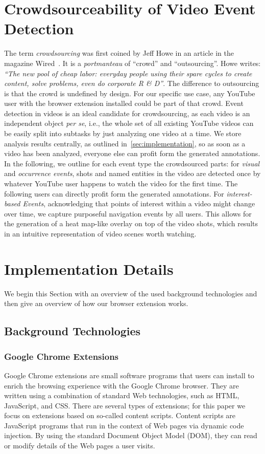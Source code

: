 \documentclass[runningheads,a4paper]{llncs}
\begin{document}
\section{Crowdsourceability of Video Event Detection} \label{sec:crowdsourcing}
The term \emph{crowdsourcing} was first coined by Jeff Howe in an article in the magazine Wired~\cite{crowdsourcing}. It is a \textit{portmanteau} of ``crowd'' and ``outsourcing''. Howe writes: \textit{``The new pool of cheap labor: everyday people using their spare cycles to create content, solve problems, even do corporate R \& D''}. The difference to outsourcing is that the crowd is undefined by design. For our specific use case, any YouTube user with the browser extension installed could be part of that crowd. Event detection in videos is an ideal candidate for crowdsourcing, as each video is an independent object \textit{per se}, i.e., the whole set of all existing YouTube videos can be easily split into subtasks by just analyzing one video at a time. We store analysis results centrally, as outlined in~\autoref{sec:implementation}, so as soon as a video has been analyzed, everyone else can profit form the generated annotations. In the following, we outline for each event type the crowdsourced parts: for \emph{visual} and \emph{occurrence events}, shots and named entities in the video are detected once by whatever YouTube user happens to watch the video for the first time. The following users can directly profit form the generated annotations. For \emph{interest-based Events}, acknowledging that points of interest within a video might change over time, we capture purposeful navigation events by all users. This allows for the generation of a heat map-like overlay on top of the video shots, which results in an intuitive representation of video scenes worth watching.

\section{Implementation Details} \label{sec:implementation}
We begin this Section with an overview of the used background technologies and then give an overview of how our browser extension works.

\subsection{Background Technologies}

\subsubsection{Google Chrome Extensions}
Google Chrome extensions are small software programs that users can install to enrich the browsing experience with the Google Chrome browser. They are written using a combination of standard Web technologies, such as HTML, JavaScript, and CSS. There are several types of extensions; for this paper we focus on extensions based on so-called content scripts. Content scripts are JavaScript programs that run in the context of Web pages via dynamic code injection. By using the standard Document Object Model (DOM), they can read or modify details of the Web pages a user visits.
\end{document}
